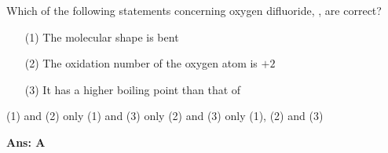 \documentclass[border=3pt,varwidth=70mm]{standalone}
\begin{document}
Which of the following statements concerning oxygen difluoride, , are correct?  

\begin{itemize}
\item[(1)] The molecular shape is bent 
\item[(2)] The oxidation number of the oxygen atom is $+2$
\item[(3)] It has a higher boiling point than that of 
\end{itemize}

\begin{choices}
\choice (1) and (2) only
\choice (1) and (3) only
\choice (2) and (3) only
\choice (1), (2) and (3)
\end{choices}


\begin{answer}
\hrulefill\par
\textbf{Ans: A}


\end{answer}
\end{document}
